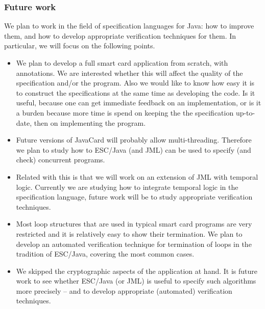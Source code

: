 \documentclass[a4paper]{llncs}
\begin{document}
\subsubsection{Future work} We plan to work in the field of
specification languages for Java: how to improve them, and how to
develop appropriate verification techniques for them. In particular,
we will focus on the following points.
\begin{itemize}
\item We plan to develop a full smart card application from scratch, with
annotations. We are interested whether this will affect the quality of 
the specification and/or the program. Also we would like to know how
easy it is to construct the specifications at the same time as
developing the code. Is it useful, because one can get immediate
feedback on an implementation, or is it a burden because more time
is spend on keeping the the specification up-to-date, then on
implementing the program.
\item Future versions of JavaCard will probably allow
multi-threading. Therefore we plan to study how to ESC/Java (and JML)
can be used to specify (and check) concurrent programs.
\item Related with this is that we will work on an extension of JML with
temporal logic. Currently we are studying how to integrate temporal
logic in the specification language, future work will be to study
appropriate verification techniques.
\item Most loop structures that are used in typical smart card
programs are very restricted and it is relatively easy to show their
termination. We plan to develop an automated verification technique for
termination of loops in the tradition of ESC/Java, covering the most
common cases.
\item We skipped the cryptographic aspects of the application at
hand. It is future work to see whether ESC/Java (or JML) is useful to
specify such algorithms more precisely -- and to develop appropriate
(automated) verification techniques.
\end{itemize}



\end{document}
